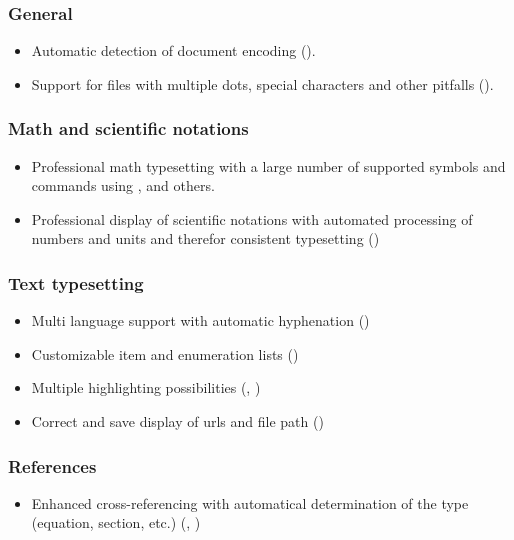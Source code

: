 \subsubsection*{General}
\begin{itemize}
\item Automatic detection of document encoding ().
\item Support for files with multiple dots, special characters and other pitfalls ().
\end{itemize}

\subsubsection*{Math and scientific notations}
\begin{itemize}
\item Professional math typesetting with a large number of supported symbols and commands using ,  and others.
%
\item Professional display of scientific notations with automated processing of numbers and units and therefor consistent typesetting ()
%
\end{itemize}

\subsubsection*{Text typesetting}
\begin{itemize}
\item Multi language support with automatic hyphenation ()
%
\item Customizable item and enumeration lists ()
%
\item Multiple highlighting possibilities (, )
%
\item Correct and save display of urls and file path ()
\end{itemize}


\subsubsection*{References}
\begin{itemize}
\item Enhanced cross-referencing with automatical determination of the type (equation, section, etc.) (, )
\end{itemize}


